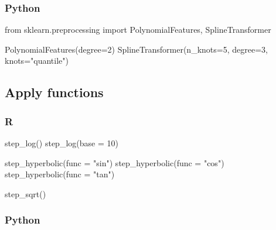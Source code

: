 \documentclass[
  letterpaper,
  DIV=11,
  numbers=noendperiod]{scrreprt}
\newenvironment{Shaded}{\begin{snugshade}}{\end{snugshade}}
\newcommand{\AttributeTok}[1]{\textcolor[rgb]{0.40,0.46,0.14}{#1}}
\newcommand{\DecValTok}[1]{\textcolor[rgb]{0.68,0.00,0.00}{#1}}
\newcommand{\FunctionTok}[1]{\textcolor[rgb]{0.28,0.35,0.67}{#1}}
\newcommand{\ImportTok}[1]{\textcolor[rgb]{0.00,0.46,0.62}{#1}}
\newcommand{\NormalTok}[1]{\textcolor[rgb]{0.00,0.46,0.62}{#1}}
\newcommand{\OperatorTok}[1]{\textcolor[rgb]{0.37,0.37,0.37}{#1}}
\newcommand{\StringTok}[1]{\textcolor[rgb]{0.13,0.47,0.30}{#1}}
\begin{document}
\hypertarget{python-68}{%
\subsubsection{Python}\label{python-68}}

\begin{Shaded}
\begin{Highlighting}[]
\ImportTok{from}\NormalTok{ sklearn.preprocessing }\ImportTok{import}\NormalTok{ PolynomialFeatures, SplineTransformer}

\NormalTok{PolynomialFeatures(degree}\OperatorTok{=}\DecValTok{2}\NormalTok{)}
\NormalTok{SplineTransformer(n\_knots}\OperatorTok{=}\DecValTok{5}\NormalTok{, degree}\OperatorTok{=}\DecValTok{3}\NormalTok{, knots}\OperatorTok{=}\StringTok{"quantile"}\NormalTok{)}
\end{Highlighting}
\end{Shaded}

\hypertarget{apply-functions}{%
\subsection{Apply functions}\label{apply-functions}}

\hypertarget{r-69}{%
\subsubsection{R}\label{r-69}}

\begin{Shaded}
\begin{Highlighting}[]
\FunctionTok{step\_log}\NormalTok{()}
\FunctionTok{step\_log}\NormalTok{(}\AttributeTok{base =} \DecValTok{10}\NormalTok{)}

\FunctionTok{step\_hyperbolic}\NormalTok{(}\AttributeTok{func =} \StringTok{"sin"}\NormalTok{)}
\FunctionTok{step\_hyperbolic}\NormalTok{(}\AttributeTok{func =} \StringTok{"cos"}\NormalTok{)}
\FunctionTok{step\_hyperbolic}\NormalTok{(}\AttributeTok{func =} \StringTok{"tan"}\NormalTok{)}

\FunctionTok{step\_sqrt}\NormalTok{()}
\end{Highlighting}
\end{Shaded}

\hypertarget{python-69}{%
\subsubsection{Python}\label{python-69}}
\end{document}
